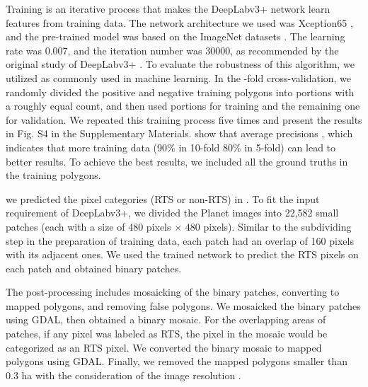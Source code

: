 \documentclass[authoryear,preprint,review,12pt]{elsarticle}
\begin{document}
Training is an iterative process that makes the DeepLabv3+ network learn features from training data. The network architecture we used was Xception65 \citep{chollet2017xception}, and the pre-trained model was based on the ImageNet datasets \citep{russakovsky2015imagenet}. The learning rate was 0.007, and the iteration number was 30000, as recommended by the original study of DeepLabv3+ \citep{chen_encoder-decoder_2018}.  To evaluate the robustness of this algorithm, we utilized  as commonly used in machine learning. In the -fold cross-validation, we randomly divided the positive and negative training polygons into  portions with a roughly equal count, and then used  portions for training and the remaining one for validation. We repeated this training process five times and present the results in Fig. S4 in the Supplementary Materials.  show that average precisions  , which indicates that more training data (90\% in 10-fold 80\% in 5-fold) can lead to better results. To achieve the best results, we included all the ground truths in the training polygons. 

 we  predicted the pixel categories (RTS or non-RTS) in . To fit the input requirement of DeepLabv3+, we divided the Planet images into 22,582 small patches (each with a size of 480 pixels $\times$ 480 pixels). Similar to the subdividing step in the preparation of training data, each patch had an overlap of 160 pixels with its adjacent ones. We used the trained network to predict the RTS pixels on each patch and obtained binary patches. 

The post-processing includes mosaicking of the binary patches, converting to mapped polygons, and removing false polygons. We mosaicked the binary patches using GDAL, then obtained a binary mosaic. For the overlapping areas of patches, if any pixel was labeled as RTS, the pixel in the mosaic would be categorized as an RTS pixel. We converted the binary mosaic to mapped polygons using GDAL. Finally, we removed the mapped polygons  smaller than 0.3 ha with the consideration of the image resolution .  
\end{document}
